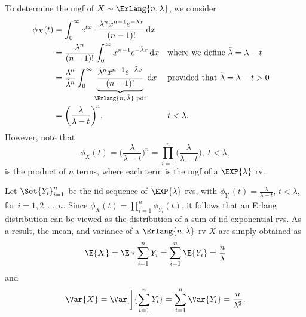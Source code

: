 \begin{Regular}
    To determine the mgf of $ X \sim \Erlang{n,\lambda} $, we consider
    \begin{align*}
        \phi_X(t)
         & =\int_{0}^{\infty}e^{tx}\cdot \frac{\lambda^n x^{n-1}e^{-\lambda x}}{(n-1)!}\odif{x}                                                                                                               \\
         & =\frac{\lambda^n}{(n-1)!}\int_{0}^{\infty}x^{n-1}e^{-\tilde{\lambda}x}\odif{x}       &                                                      & \text{where we define $ \tilde{\lambda}=\lambda-t $} \\
         & =\frac{\lambda^n}{\tilde{\lambda}^n}
        \int_{0}^{\infty}
        \underbrace{\frac{\tilde{\lambda}^n x^{n-1}e^{-\tilde{\lambda}x}}{(n-1)!}}_{\text{$\Erlang{n,\tilde{\lambda}}$ pdf}}\odif{x}
         &                                                                                      & \text{provided that $ \tilde{\lambda}=\lambda-t>0 $}                                                        \\
         & =\biggl(\frac{\lambda}{\lambda-t}\biggr)^{\!n},                                      &                                                      & t<\lambda.
    \end{align*}
    However, note that
    \[ \phi_X(t)=\biggl(\frac{\lambda}{\lambda-t}\biggr)^{\!n}=\prod_{i=1}^n\biggl(\frac{\lambda}{\lambda-t}\biggr),\;t<\lambda, \]
    is the product of $ n $ terms, where each term is the mgf of a $ \EXP{\lambda} $ rv.

    Let $ \Set{Y_i}_{i=1}^n $ be the iid sequence of $ \EXP{\lambda} $ rvs, with $ \phi_{Y_i}(t)=\frac{\lambda}{\lambda-t} $, $ t<\lambda $,
    for $ i=1,2,\ldots,n $. Since $ \phi_X(t)=\prod_{i=1}^n \phi_{Y_i}(t) $, it follows that an Erlang distribution can be viewed as the
    distribution of a sum of iid exponential rvs. As a result, the mean, and variance of a $ \Erlang{n,\lambda} $ rv $ X $
    are simply obtained as
    \[ \E{X}=\E*{\sum_{i=1}^{n}Y_i}=\sum_{i=1}^{n}\E{Y_i}=\frac{n}{\lambda} \]
    and
    \[ \Var{X}=\Var[\bigg]{\sum_{i=1}^{n}Y_i}=\sum_{i=1}^{n}\Var{Y_i}=\frac{n}{\lambda^2}. \]
\end{Regular}